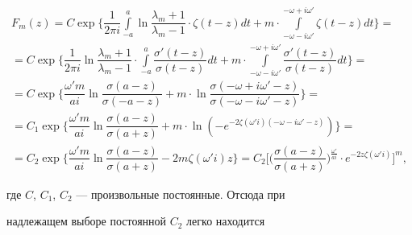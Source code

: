 \begin{multline*}


F_{m}(z)=C\exp\bigg\{\dfrac{1}{2\pi i}\int\limits


^{a}_{-a}\ln\dfrac{\lambda_{m}+1}{\lambda_{m}-1}


\cdot\zeta(t-z)dt+m\cdot\int\limits


^{-\omega+i\omega'}_{-\omega-i\omega'}\zeta(t-z)dt\bigg\}= \\


%


=C\exp\bigg\{\dfrac{1}{2\pi i}\ln


\dfrac{\lambda_{m}+1}{\lambda_{m}-1}\cdot


\int\limits^{a}_{-a}\dfrac{\sigma'(t-z)}{\sigma(t-z)}dt+


m\cdot\int\limits^{-\omega+i\omega'}_{-\omega-i\omega'}


\dfrac{\sigma'(t-z)}{\sigma(t-z)}dt \bigg\}= \\


%


=C\exp\bigg\{\dfrac{\omega' m}{ai}\ln


\dfrac{\sigma(a-z)}{\sigma(-a-z)}+


m\cdot\ln\dfrac{\sigma(-\omega+i\omega'-z)}


{\sigma(-\omega-i\omega'-z)}\bigg\}= \\


%


=C_{1}\exp\bigg\{\dfrac{\omega' m}{ai}\ln


\dfrac{\sigma(a-z)}{\sigma(a+z)}+m\cdot


\ln\left(-e^{-2\zeta(\omega' i)(-\omega-i\omega'-z)}


\right)\bigg\}= \\


%


=C_{2}\exp\bigg\{\dfrac{\omega' m}{ai}\ln


\dfrac{\sigma(a-z)}{\sigma(a+z)}-2m\zeta(\omega' i)z\bigg\}


=C_{2}\bigg[\bigg(\dfrac{\sigma(a-z)}{\sigma(a+z)}\bigg)


^{\frac{\omega'}{ai}} \cdot e^{-2z\zeta(\omega'


i)}\bigg]^{m},


\end{multline*}


где $C$, $C_{1}$, $C_{2}$ --- произвольные постоянные. Отсюда при


надлежащем выборе постоянной $C_{2}$ легко находится


